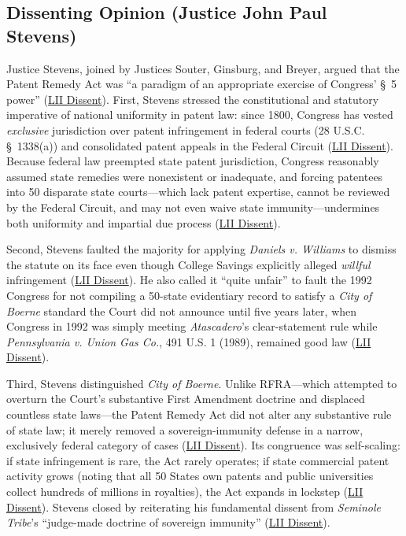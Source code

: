 \documentclass[12pt]{article}
\begin{document}
\subsection{Dissenting Opinion (Justice John Paul Stevens)}

Justice Stevens, joined by Justices Souter, Ginsburg, and Breyer, argued that the Patent Remedy Act was ``a paradigm of an appropriate exercise of Congress' \S~5 power'' (\href{https://www.law.cornell.edu/supct/html/98-531.ZD.html}{LII Dissent}). First, Stevens stressed the constitutional and statutory imperative of national uniformity in patent law: since 1800, Congress has vested \textit{exclusive} jurisdiction over patent infringement in federal courts (28 U.S.C. \S~1338(a)) and consolidated patent appeals in the Federal Circuit (\href{https://www.law.cornell.edu/supct/html/98-531.ZD.html}{LII Dissent}). Because federal law preempted state patent jurisdiction, Congress reasonably assumed state remedies were nonexistent or inadequate, and forcing patentees into 50 disparate state courts---which lack patent expertise, cannot be reviewed by the Federal Circuit, and may not even waive state immunity---undermines both uniformity and impartial due process (\href{https://www.law.cornell.edu/supct/html/98-531.ZD.html}{LII Dissent}).

Second, Stevens faulted the majority for applying \textit{Daniels v. Williams} to dismiss the statute on its face even though College Savings explicitly alleged \textit{willful} infringement (\href{https://www.law.cornell.edu/supct/html/98-531.ZD.html}{LII Dissent}). He also called it ``quite unfair'' to fault the 1992 Congress for not compiling a 50-state evidentiary record to satisfy a \textit{City of Boerne} standard the Court did not announce until five years later, when Congress in 1992 was simply meeting \textit{Atascadero}'s clear-statement rule while \textit{Pennsylvania v. Union Gas Co.}, 491 U.S. 1 (1989), remained good law (\href{https://www.law.cornell.edu/supct/html/98-531.ZD.html}{LII Dissent}).

Third, Stevens distinguished \textit{City of Boerne}. Unlike RFRA---which attempted to overturn the Court's substantive First Amendment doctrine and displaced countless state laws---the Patent Remedy Act did not alter any substantive rule of state law; it merely removed a sovereign-immunity defense in a narrow, exclusively federal category of cases (\href{https://www.law.cornell.edu/supct/html/98-531.ZD.html}{LII Dissent}). Its congruence was self-scaling: if state infringement is rare, the Act rarely operates; if state commercial patent activity grows (noting that all 50 States own patents and public universities collect hundreds of millions in royalties), the Act expands in lockstep (\href{https://www.law.cornell.edu/supct/html/98-531.ZD.html}{LII Dissent}). Stevens closed by reiterating his fundamental dissent from \textit{Seminole Tribe}'s ``judge-made doctrine of sovereign immunity'' (\href{https://www.law.cornell.edu/supct/html/98-531.ZD.html}{LII Dissent}).
\end{document}
